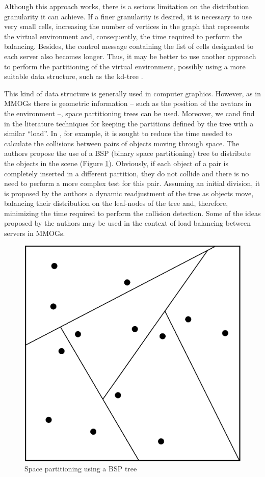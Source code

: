 \documentclass[acmtocl]{acmtrans2m}
\begin{document}
Although this approach works, there is a serious limitation on the distribution granularity it can achieve. If a finer granularity is desired, it is necessary to use very small cells, increasing the number of vertices in the graph that represents the virtual environment and, consequently, the time required to perform the balancing. Besides, the control message containing the list of cells designated to each server also becomes longer. Thus, it may be better to use another approach to perform the partitioning of the virtual environment, possibly using a more suitable data structure, such as the kd-tree \cite{bentley1975mbs}.

This kind of data structure is generally used in computer graphics. However, as in MMOGs there is geometric information -- such as the position of the avatars in the environment --, space partitioning trees can be used. Moreover, we cand find in the literature techniques for keeping the partitions defined by the tree with a similar ``load''. In \cite{luque2005bpc}, for example, it is sought to reduce the time needed to calculate the collisions between pairs of objects moving through space. The authors propose the use of a BSP (binary space partitioning) tree to distribute the objects in the scene (Figure \ref{fig:bsp}). Obviously, if each object of a pair is completely inserted in a different partition, they do not collide and there is no need to perform a more complex test for this pair. Assuming an initial division, it is proposed by the authors a dynamic readjustment of the tree as objects move, balancing their distribution on the leaf-nodes of the tree and, therefore, minimizing the time required to perform the collision detection. Some of the ideas proposed by the authors may be used in the context of load balancing between servers in MMOGs.

\begin{figure}[!t]
	\centering
	\includegraphics[width=0.5\linewidth]{images/bsp}
	\caption{Space partitioning using a BSP tree}
	\label{fig:bsp}
\end{figure}
\end{document}
